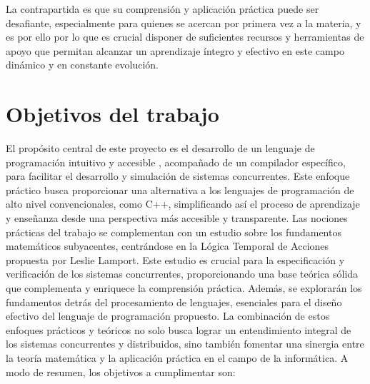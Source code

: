 La contrapartida es que su comprensión y aplicación práctica puede ser desafiante, especialmente para quienes se acercan por primera vez a la materia, y es por ello por lo que es crucial disponer de suficientes recursos y herramientas de apoyo que permitan alcanzar un aprendizaje íntegro y efectivo en este campo dinámico y en constante evolución.


\section{Objetivos del trabajo}
El propósito central de este proyecto es el desarrollo de un lenguaje de programación intuitivo y accesible , acompañado de un compilador específico, para facilitar el desarrollo y simulación de sistemas concurrentes. Este enfoque práctico busca proporcionar una alternativa a los lenguajes de programación de alto nivel convencionales, como C++, simplificando así el proceso de aprendizaje y enseñanza desde una perspectiva más accesible y transparente. Las nociones prácticas del trabajo se complementan con un estudio sobre los fundamentos matemáticos subyacentes, centrándose en la Lógica Temporal de Acciones propuesta por Leslie Lamport. Este estudio es crucial para la especificación y verificación de los sistemas concurrentes, proporcionando una base teórica sólida que complementa y enriquece la comprensión práctica. Además, se explorarán los fundamentos detrás del procesamiento de lenguajes, esenciales para el diseño efectivo del lenguaje de programación propuesto. La combinación de estos enfoques prácticos y teóricos no solo busca lograr un entendimiento integral de los sistemas concurrentes y distribuidos, sino también fomentar una sinergia entre la teoría matemática y la aplicación práctica en el campo de la informática. A modo de resumen, los objetivos a cumplimentar son:

